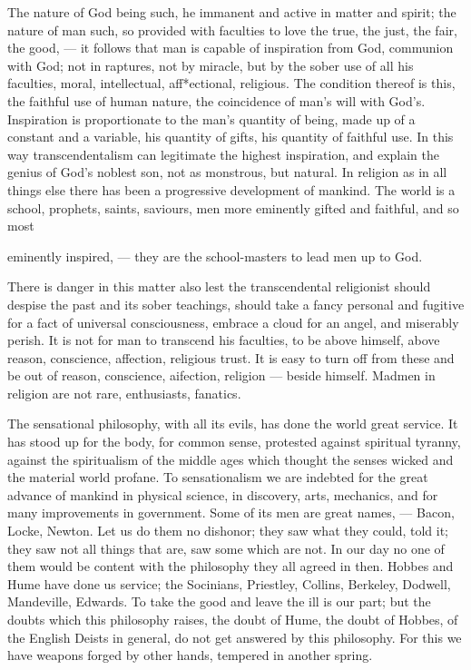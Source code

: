 \documentclass[12pt]{article}
\begin{document}
The nature of God being such, he immanent and 
active in matter and spirit; the nature of man such, 
so provided with faculties to love the true, the just, 
the fair, the good, --- it follows that man is capable of 
inspiration from God, communion with God; not in 
raptures, not by miracle, but by the sober use of all his 
faculties, moral, intellectual, aff*ectional, religious. The 
condition thereof is this, the faithful use of human 
nature, the coincidence of man's will with God's. Inspiration is proportionate to the man's quantity of 
being, made up of a constant and a variable, his quantity of gifts, his quantity of faithful use. In this way 
transcendentalism can legitimate the highest inspiration, and explain the genius of God's noblest son, not 
as monstrous, but natural. In religion as in all things 
else there has been a progressive development of mankind. The world is a school, prophets, saints, saviours, 
men more eminently gifted and faithful, and so most 


eminently inspired, --- they are the school-masters to 
lead men up to God. 

There is danger in this matter also lest the transcendental religionist should despise the past and its 
sober teachings, should take a fancy personal and fugitive for a fact of universal consciousness, embrace a 
cloud for an angel, and miserably perish. It is not for 
man to transcend his faculties, to be above himself, 
above reason, conscience, affection, religious trust. It 
is easy to turn off from these and be out of reason, conscience, aifection, religion --- beside himself. Madmen 
in religion are not rare, enthusiasts, fanatics. 

The sensational philosophy, with all its evils, has done 
the world great service. It has stood up for the body, 
for common sense, protested against spiritual tyranny, 
against the spiritualism of the middle ages which 
thought the senses wicked and the material world profane. To sensationalism we are indebted for the great 
advance of mankind in physical science, in discovery, 
arts, mechanics, and for many improvements in government. Some of its men are great names, --- Bacon, 
Locke, Newton. Let us do them no dishonor; they saw 
what they could, told it; they saw not all things that 
are, saw some which are not. In our day no one of 
them would be content with the philosophy they all 
agreed in then. Hobbes and Hume have done us service; the Socinians, Priestley, Collins, Berkeley, Dodwell, Mandeville, Edwards. To take the good and 
leave the ill is our part; but the doubts which this 
philosophy raises, the doubt of Hume, the doubt of 
Hobbes, of the English Deists in general, do not get 
answered by this philosophy. For this we have weapons forged by other hands, tempered in another spring. 
\end{document}
